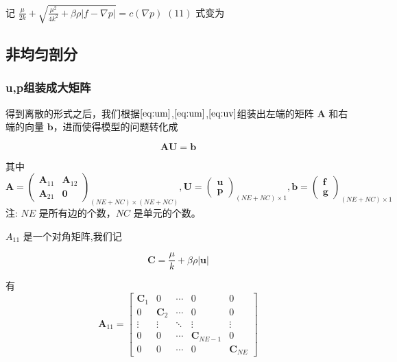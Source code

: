 \documentclass[leqno]{article}
\begin{document}
记 $\frac{\mu}{2k} + \sqrt{\frac{\mu^2}{4k^2} + \beta\rho|f-\nabla p|} = c(\nabla p)$
$(11)$ 式变为

\subsection{非均匀剖分}
\subsubsection{u,p组装成大矩阵}
得到离散的形式之后，我们根据$\eqref{eq:um}$,$\eqref{eq:um}$,$\eqref{eq:uv}$组装出左端的矩阵 $\boldsymbol A$ 和右端的向量 $\boldsymbol b$，进而使得模型的问题转化成

\begin{equation*}
\boldsymbol A\boldsymbol U = \boldsymbol b
\end{equation*}

其中
\begin{equation*}
\boldsymbol A = \begin{pmatrix}
\boldsymbol A_{11} & \boldsymbol A_{12} \\
\boldsymbol A_{21} & \boldsymbol 0
\end{pmatrix}_{(NE+NC)\times (NE+NC)},
\boldsymbol U = \begin{pmatrix}
\boldsymbol u \\
\boldsymbol p
\end{pmatrix}_{(NE+NC)\times 1},
\boldsymbol b = \begin{pmatrix}
\boldsymbol f \\
\boldsymbol g
\end{pmatrix}_{(NE+NC)\times 1}
\end{equation*}
注: $NE$ 是所有边的个数，$NC$ 是单元的个数。

$A_{11}$ 是一个对角矩阵,我们记

\begin{equation*}
\boldsymbol C = \frac{\mu}{k} + \beta\rho\left|\boldsymbol{u}\right|
\end{equation*}

有
\begin{equation*}
\boldsymbol A_{11} = \begin{bmatrix}
\boldsymbol C_1 & 0 & \cdots & 0 & 0 \\
0 & \boldsymbol C_2 & \cdots & 0 & 0 \\
\vdots & \vdots & \ddots & \vdots & \vdots \\
0 & 0 & \cdots & \boldsymbol C_{NE-1} & 0 \\
0 & 0 & \cdots & 0 & \boldsymbol C_{NE}
\end{bmatrix}
\end{equation*}

\newpage
\nocite{*}

\end{document}
